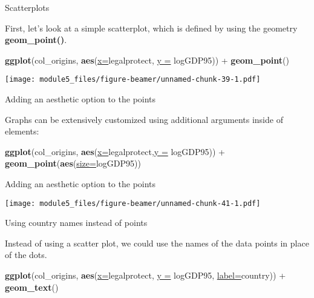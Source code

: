 \documentclass[ignorenonframetext,]{beamer}
\newenvironment{Shaded}{\begin{snugshade}}{\end{snugshade}}
\newcommand{\KeywordTok}[1]{\textcolor[rgb]{0.26,0.66,0.93}{\textbf{#1}}}
\newcommand{\DataTypeTok}[1]{\textcolor[rgb]{0.74,0.68,0.62}{\underline{#1}}}
\newcommand{\StringTok}[1]{\textcolor[rgb]{0.02,0.61,0.04}{#1}}
\newcommand{\OperatorTok}[1]{\textcolor[rgb]{0.74,0.68,0.62}{#1}}
\newcommand{\NormalTok}[1]{\textcolor[rgb]{0.74,0.68,0.62}{#1}}
\begin{document}
\begin{frame}[fragile]{Scatterplots}

First, let's look at a simple scatterplot, which is defined by using the
geometry \textbf{geom\_point()}.

\begin{Shaded}
\begin{Highlighting}[]
\KeywordTok{ggplot}\NormalTok{(col_origins, }\KeywordTok{aes}\NormalTok{(}\DataTypeTok{x=}\NormalTok{legalprotect, }
            \DataTypeTok{y =}\NormalTok{ logGDP95)) }\OperatorTok{+}\StringTok{ }\KeywordTok{geom_point}\NormalTok{() }
\end{Highlighting}
\end{Shaded}

\texttt{[image: module5\_files/figure-beamer/unnamed-chunk-39-1.pdf]}

\end{frame}

\begin{frame}[fragile]{Adding an aesthetic option to the points}

Graphs can be extensively customized using additional arguments inside
of elements:

\begin{Shaded}
\begin{Highlighting}[]
\KeywordTok{ggplot}\NormalTok{(col_origins, }\KeywordTok{aes}\NormalTok{(}\DataTypeTok{x=}\NormalTok{legalprotect,}\DataTypeTok{y =}\NormalTok{ logGDP95)) }\OperatorTok{+}\StringTok{ }
\StringTok{  }\KeywordTok{geom_point}\NormalTok{(}\KeywordTok{aes}\NormalTok{(}\DataTypeTok{size=}\NormalTok{logGDP95))}
\end{Highlighting}
\end{Shaded}

\end{frame}

\begin{frame}{Adding an aesthetic option to the points}

\texttt{[image: module5\_files/figure-beamer/unnamed-chunk-41-1.pdf]}

\end{frame}

\begin{frame}[fragile]{Using country names instead of points}

Instead of using a scatter plot, we could use the names of the data
points in place of the dots.

\begin{Shaded}
\begin{Highlighting}[]
\KeywordTok{ggplot}\NormalTok{(col_origins, }
       \KeywordTok{aes}\NormalTok{(}\DataTypeTok{x=}\NormalTok{legalprotect, }\DataTypeTok{y =}\NormalTok{ logGDP95, }
       \DataTypeTok{label=}\NormalTok{country)) }\OperatorTok{+}\StringTok{  }\KeywordTok{geom_text}\NormalTok{()}
\end{Highlighting}
\end{Shaded}

\end{frame}
\end{document}
